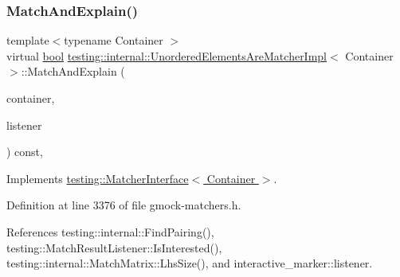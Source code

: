 \mbox{\label{classtesting_1_1internal_1_1UnorderedElementsAreMatcherImpl_a4031291eef9be8c1e9e1effdd02c4334}} 
\subsubsection{\texorpdfstring{Match\+And\+Explain()}{MatchAndExplain()}}
{\footnotesize\ttfamily template$<$typename Container $>$ \\
virtual \hyperlink{classbool}{bool} \hyperlink{classtesting_1_1internal_1_1UnorderedElementsAreMatcherImpl}{testing\+::internal\+::\+Unordered\+Elements\+Are\+Matcher\+Impl}$<$ Container $>$\+::Match\+And\+Explain (\begin{DoxyParamCaption}\item[{Container}]{container,  }\item[{\hyperlink{classtesting_1_1MatchResultListener}{Match\+Result\+Listener} $\ast$}]{listener }\end{DoxyParamCaption}) const\hspace{0.3cm}{\ttfamily [inline]}, {\ttfamily [virtual]}}



Implements \hyperlink{classtesting_1_1MatcherInterface_a296b43607cd99d60365f0e6a762777cf}{testing\+::\+Matcher\+Interface$<$ Container $>$}.



Definition at line 3376 of file gmock-\/matchers.\+h.



References testing\+::internal\+::\+Find\+Pairing(), testing\+::\+Match\+Result\+Listener\+::\+Is\+Interested(), testing\+::internal\+::\+Match\+Matrix\+::\+Lhs\+Size(), and interactive\+\_\+marker\+::listener.


